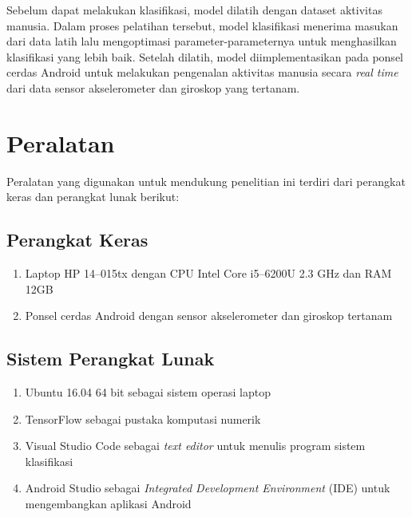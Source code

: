 Sebelum dapat melakukan klasifikasi, model dilatih dengan dataset aktivitas manusia. Dalam proses pelatihan tersebut, model klasifikasi menerima masukan dari data latih lalu mengoptimasi parameter-parameternya untuk menghasilkan klasifikasi yang lebih baik. Setelah dilatih, model diimplementasikan pada ponsel cerdas Android untuk melakukan pengenalan aktivitas manusia secara \textit{real time} dari data sensor akselerometer dan giroskop yang tertanam.

\section{Peralatan}
Peralatan yang digunakan untuk mendukung penelitian ini terdiri dari perangkat keras dan perangkat lunak berikut:

\subsection{Perangkat Keras}
\begin{enumerate}
    \item Laptop HP 14--015tx dengan CPU Intel Core i5--6200U 2.3 GHz dan RAM 12GB
    \item Ponsel cerdas Android dengan sensor akselerometer dan giroskop tertanam
\end{enumerate}

\subsection{Sistem Perangkat Lunak}
\begin{enumerate}
    \item Ubuntu 16.04 64 bit sebagai sistem operasi laptop
    \item TensorFlow sebagai pustaka komputasi numerik
    \item Visual Studio Code sebagai \textit{text editor} untuk menulis program sistem klasifikasi
    \item Android Studio sebagai \textit{Integrated Development Environment} (IDE) untuk mengembangkan aplikasi Android
\end{enumerate}

%
%

